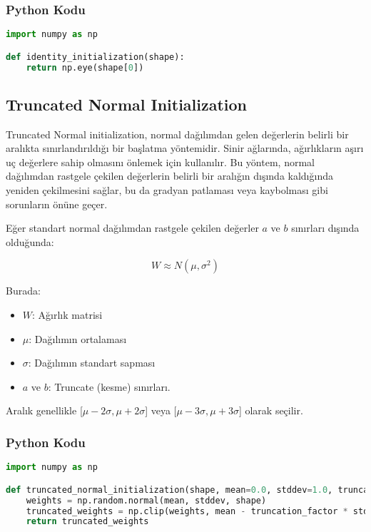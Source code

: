 \subsubsection{Python Kodu}

\begin{lstlisting}[language=Python]
import numpy as np

def identity_initialization(shape):
    return np.eye(shape[0])
\end{lstlisting}

\newpage

\subsection{Truncated Normal Initialization}

Truncated Normal initialization, normal dağılımdan gelen değerlerin belirli bir aralıkta sınırlandırıldığı bir başlatma yöntemidir. Sinir ağlarında, ağırlıkların aşırı uç değerlere sahip olmasını önlemek için kullanılır. Bu yöntem, normal dağılımdan rastgele çekilen değerlerin belirli bir aralığın dışında kaldığında yeniden çekilmesini sağlar, bu da gradyan patlaması veya kaybolması gibi sorunların önüne geçer.

Eğer standart normal dağılımdan rastgele çekilen değerler $a$ ve $b$ sınırları dışında olduğunda:

\[ W \approx N(\mu, \sigma^2) \]

Burada:

\begin{itemize}
    \item $W$: Ağırlık matrisi
    \item $\mu$: Dağılımın ortalaması
    \item $\sigma$: Dağılımın standart sapması
    \item $a$ ve $b$: Truncate (kesme) sınırları.
\end{itemize}

Aralık genellikle [$\mu - 2 \sigma, \mu + 2 \sigma$] veya [$\mu - 3 \sigma, \mu + 3 \sigma$] olarak seçilir.

\subsubsection{Python Kodu}

\begin{lstlisting}[language=Python]
import numpy as np

def truncated_normal_initialization(shape, mean=0.0, stddev=1.0, truncation_factor=2.0):
    weights = np.random.normal(mean, stddev, shape)
    truncated_weights = np.clip(weights, mean - truncation_factor * stddev, mean + truncation_factor * stddev)
    return truncated_weights
\end{lstlisting}

\newpage